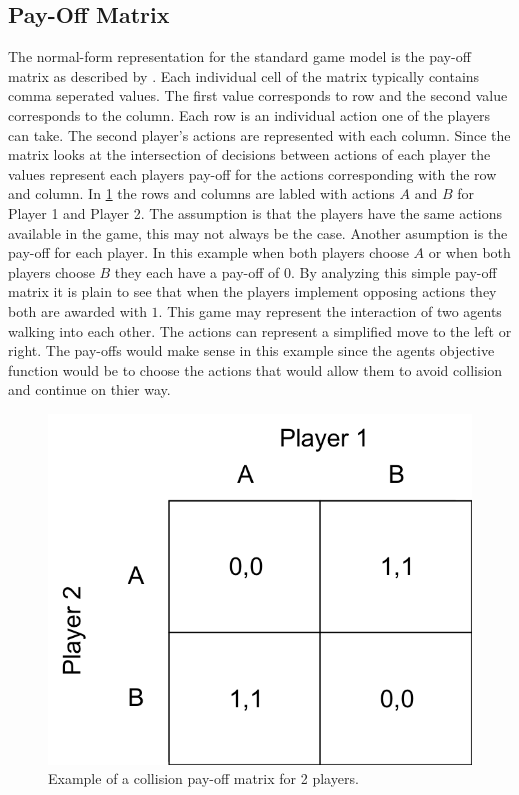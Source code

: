 \documentclass[phd, 12pt, print]{fauthesis}
\begin{document}
\subsection{Pay-Off Matrix}
The normal-form representation for the standard game model is 
the pay-off matrix as described by \cite{McEachern}. Each individual cell of the matrix 
typically contains comma seperated values. The first value corresponds to row and the 
second value corresponds to the column. Each row is an individual action one of the players can take.
The second player's actions are represented with each column. Since the matrix looks 
at the intersection of decisions between actions of each player the values represent 
each players pay-off for the actions corresponding with the row and column.
In \ref{fig:Pay-offMatrixfor2PlayersSample} the rows and columns are labled with actions 
$A$ and $B$ for Player 1 and Player 2. The assumption is that the players have the same 
actions available in the game, this may not always be the case. Another asumption is the 
pay-off for each player. In this example when both players choose $A$  or when both 
players choose $B$ they each have a pay-off of $0$. By analyzing this simple pay-off matrix
it is plain to see that when the players implement opposing actions they both are awarded with 
$1$. This game may represent the interaction of two agents walking into each other. The actions
can represent a simplified move to the left or right. The pay-offs would make sense in this 
example since the agents objective function would be to choose the actions that would allow them
to avoid collision and continue on thier way. 

\begin{figure}[th]
    \centering
    \includegraphics[width=5.0in]{Figures/pay-off-matrix-sample.png}
    \caption[A 2-Player Pay-off Matrix]{Example of a collision pay-off matrix for 2 players.}
    \label{fig:Pay-offMatrixfor2PlayersSample}
  \end{figure}
\end{document}

